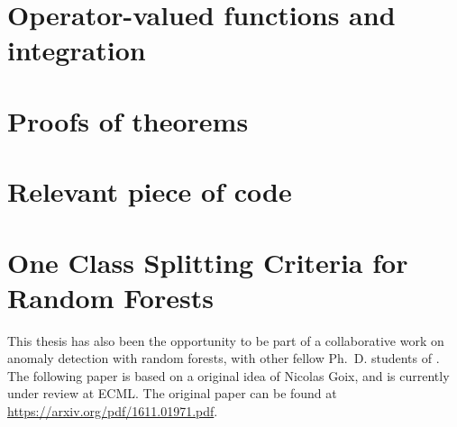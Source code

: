 
\chapter{Operator-valued functions and integration}
\label{ch:operator-valued_functions_and_integration}

\chapter{Proofs of theorems}
\label{ch:proof_of_theorems}


\chapter{Relevant piece of code}
\label{ch:relevant_piece_of_code}


\chapter{One Class Splitting Criteria for Random Forests}
\label{ch:one_class_splitting}
\bigskip
\begin{justify}
This thesis has also been the opportunity to be part of a
collaborative work on anomaly detection with random forests, with other fellow
Ph.~D. students of \myUniTP. The following paper \citet{goix2016one} is based
on a original idea of Nicolas Goix, and is currently under review at
\acs{ECML}. The original paper can be found at
\url{https://arxiv.org/pdf/1611.01971.pdf}.
\end{justify}
\minitoc


